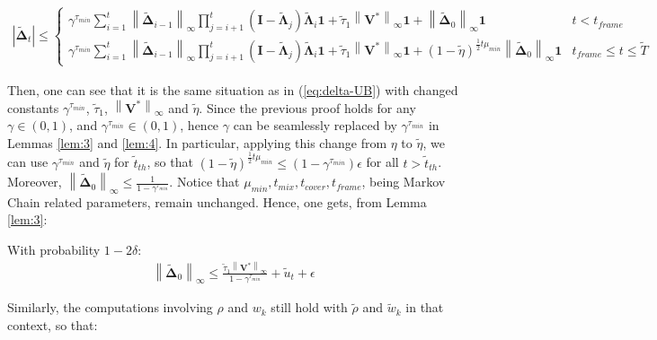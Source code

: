 \begin{align}
  \left| \tilde{\mathbf{\Delta}}_t \right| \leq \begin{cases} \gamma^{\tau_{min}} \sum_{i=1}^{t}\left\| \tilde{\mathbf{\Delta}}_{i-1} \right\|_\infty \prod_{j=i+1}^{t} (\mathbf{I}-\tilde{\mathbf{\Lambda}}_j)\tilde{\mathbf{\Lambda}}_i \mathbf{1} + \tilde\tau_1 \left\| \mathbf{V}^* \right\|_\infty \mathbf{1} + \left\| \tilde{\mathbf{\Delta}}_0 \right\|_\infty \mathbf{1} & t < t_{frame}\\ \gamma^{\tau_{min}} \sum_{i=1}^{t}\left\| \tilde{\mathbf{\Delta}}_{i-1} \right\|_\infty \prod_{j=i+1}^{t} (\mathbf{I}-\tilde{\mathbf{\Lambda}}_j)\tilde{\mathbf{\Lambda}}_i \mathbf{1} + \tilde\tau_1 \left\| \mathbf{V}^* \right\|_\infty \mathbf{1} + (1-\tilde\eta)^{\frac{1}{2}t \mu_{min}} \left\| \tilde{\mathbf{\Delta}}_0 \right\|_\infty \mathbf{1} & t_{frame} \leq t \leq \tilde T\end{cases}\label{eq:delta-UB-b}
\end{align}

Then, one can see that it is the same situation as in (\ref{eq:delta-UB}) with changed constants $\gamma^{\tau_{min}}$, $\tilde\tau_1$, $\left\| \mathbf{V}^* \right\|_\infty$ and $\tilde\eta$. Since the previous proof holds for any $\gamma \in (0, 1)$, and $\gamma^{\tau_{min}} \in (0,1)$, hence $\gamma$ can be seamlessly replaced by $\gamma^{\tau_{min}}$ in Lemmas \ref{lem:3} and \ref{lem:4}. In particular, applying this change from $\eta$ to $\tilde\eta$, we can use $\gamma^{\tau_{min}}$ and $\tilde\eta$ for $\tilde t_{th}$, so that $(1-\tilde\eta)^{\frac{1}{2}t \mu_{min}} \leq (1-\gamma^{\tau_{min}})\epsilon$ for all $t > \tilde t_{th}$. Moreover, $\left\| \tilde{\mathbf{\Delta}}_0 \right\|_\infty \leq \frac{1}{1-\gamma^{\tau_{min}}}$. Notice that $\mu_{min}, t_{mix}, t_{cover}, t_{frame}$, being Markov Chain related parameters, remain unchanged. Hence, one gets, from Lemma \ref{lem:3}:

\begin{lem}
  With probability $1-2\delta$:
  \begin{align}
    \left\| \tilde{\mathbf{\Delta}}_0 \right\|_\infty \leq \frac{\tilde\tau_1 \left\| \mathbf{V}^* \right\|_\infty}{1-\gamma^{\tau_{min}}} + \tilde u_t + \epsilon
  \end{align}
\end{lem}

Similarly, the computations involving $\rho$ and $w_k$ still hold with $\tilde\rho$ and $\tilde w_k$ in that context, so that:

